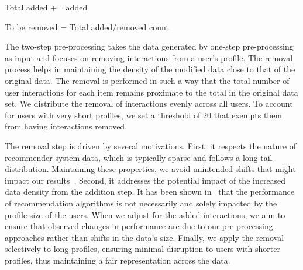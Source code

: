 \documentclass[runningheads]{llncs}
\begin{document}
\begin{algorithm}[h]
{{{        
    }
    }
    Total added += added
  



To be removed = Total added/removed count 

  
\caption{One and two-step pre-processing algorithm.}
\label{algo:1step}
}
\end{algorithm}
The two-step pre-processing takes the data generated by one-step pre-processing as input and focuses on removing %
interactions from a user's profile. 
The removal process helps in maintaining the density of the modified data close to that of the original data. 
The removal is performed in such a way that the total number of user interactions for each item remains proximate to the total in the original data set. 
We distribute the removal of interactions evenly across all users.
To account for users with very short profiles, we set a threshold of 20 that exempts them from having interactions removed.


The removal step is driven by several motivations. 
First, it respects the nature of recommender system data, which is typically sparse and follows a long-tail distribution. 
Maintaining these properties, we avoid unintended shifts that might impact our results~\cite{deldjoo2021explaining}. 
Second, it addresses the potential impact of the increased data density from the addition step. 
It has been shown in~\cite{pmlr-v81-ekstrand18b} that the performance of recommendation algorithms is not necessarily and solely impacted by the profile size of the users. 
When we adjust for the added interactions, we aim to ensure that observed changes in performance are due to our pre-processing approaches rather than shifts in the data's size.
Finally, we apply the removal selectively to long profiles, ensuring minimal disruption to users with shorter profiles, thus maintaining a fair representation across the data.
\end{document}
